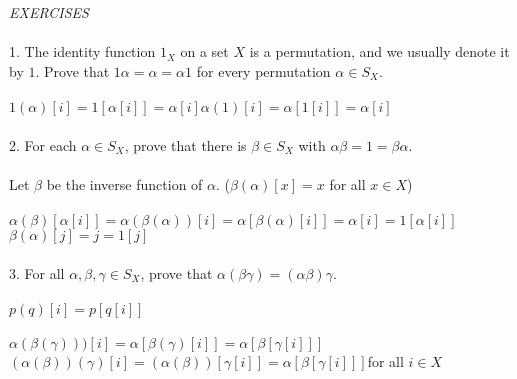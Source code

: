 \documentclass{article}
\begin{document}
\begin{siderules}
\color{blue}\textit{EXERCISES}\color{black}\\\\
\color{blue}1. The identity function \(1_X\) on a set \(X\) is a permutation, and we usually denote it by \(1\). Prove that \(1\alpha=\alpha=\alpha 1\) for every permutation \(\alpha\in S_X\).\color{black}\\\\
\null\qquad\(1(\alpha)[i]=1[\alpha[i]]=\alpha[i]\)\quad\(\alpha(1)[i]=\alpha[1[i]]=\alpha[i]\)\\\\
\color{blue}2. For each \(\alpha\in S_X\), prove that there is \(\beta\in S_X\) with \(\alpha\beta=1=\beta\alpha\).\color{black}\\\\
\null\qquad Let \(\beta\) be the inverse function of \(\alpha\). (\(\beta(\alpha)[x]=x\) for all \(x\in X\))\\\\
\null\qquad\(\alpha(\beta)[\alpha[i]]=\alpha(\beta(\alpha))[i]=\alpha[\beta(\alpha)[i]]=\alpha[i]=1[\alpha[i]]\)\quad\(\beta(\alpha)[j]=j=1[j]\)\\\\
\color{blue}3. For all \(\alpha,\beta,\gamma\in S_X\), prove that \(\alpha(\beta\gamma)=(\alpha\beta)\gamma\).\color{black}\\\\
\null\qquad\(p(q)[i]=p[q[i]]\)\\\\
\null\qquad\(\alpha(\beta(\gamma)))[i]=\alpha[\beta(\gamma)[i]]=\alpha[\beta[\gamma[i]]]\)\quad\((\alpha(\beta))(\gamma)[i]=(\alpha(\beta))[\gamma[i]]=\alpha[\beta[\gamma[i]]]\)\quad for all \(i\in X\)\\
\end{siderules}
\end{document}
